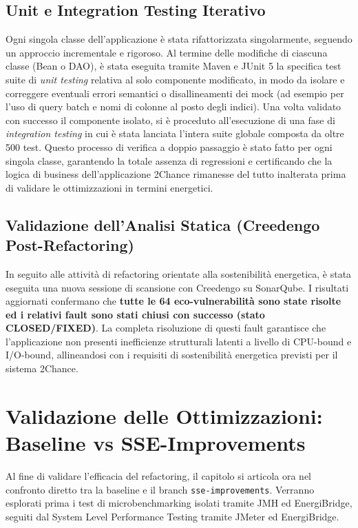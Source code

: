\subsection{Unit e Integration Testing Iterativo}
Ogni singola classe dell'applicazione è stata rifattorizzata singolarmente, seguendo un approccio incrementale e rigoroso. Al termine delle modifiche di ciascuna classe (Bean o DAO), è stata eseguita tramite Maven e JUnit 5 la specifica test suite di \textit{unit testing} relativa al solo componente modificato, in modo da isolare e correggere eventuali errori semantici o disallineamenti dei mock (ad esempio per l'uso di query batch e nomi di colonne al posto degli indici). Una volta validato con successo il componente isolato, si è proceduto all'esecuzione di una fase di \textit{integration testing} in cui è stata lanciata l'intera suite globale composta da oltre 500 test. Questo processo di verifica a doppio passaggio è stato fatto per ogni singola classe, garantendo la totale assenza di regressioni e certificando che la logica di business dell'applicazione 2Chance rimanesse del tutto inalterata prima di validare le ottimizzazioni in termini energetici.

\subsection{Validazione dell'Analisi Statica (Creedengo Post-Refactoring)}
In seguito alle attività di refactoring orientate alla sostenibilità energetica, è stata eseguita una nuova sessione di scansione con Creedengo su SonarQube. I risultati aggiornati confermano che \textbf{tutte le 64 eco-vulnerabilità sono state risolte ed i relativi fault sono stati chiusi con successo (stato CLOSED/FIXED)}. La completa risoluzione di questi fault garantisce che l'applicazione non presenti inefficienze strutturali latenti a livello di CPU-bound e I/O-bound, allineandosi con i requisiti di sostenibilità energetica previsti per il sistema 2Chance.

\section{Validazione delle Ottimizzazioni: Baseline vs SSE-Improvements}

Al fine di validare l'efficacia del refactoring, il capitolo si articola ora nel confronto diretto tra la baseline e il branch \texttt{sse-improvements}. Verranno esplorati prima i test di microbenchmarking isolati tramite JMH ed EnergiBridge, seguiti dal System Level Performance Testing tramite JMeter ed EnergiBridge.

